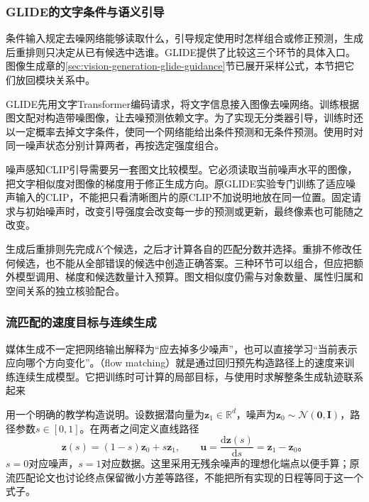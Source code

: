 \subsubsection{GLIDE的文字条件与语义引导}
\label{sec:vision-models-glide}

条件输入规定去噪网络能够读取什么，引导规定使用时怎样组合或修正预测，生成后重排则只决定从已有候选中选谁。GLIDE提供了比较这三个环节的具体入口。图像生成章的\ref{sec:vision-generation-glide-guidance}节已展开采样公式，本节把它们放回模块关系中。

GLIDE先用文字Transformer编码请求，将文字信息接入图像去噪网络。训练根据图文配对构造带噪图像，让去噪预测依赖文字。为了实现无分类器引导，训练时还以一定概率去掉文字条件，使同一个网络能给出条件预测和无条件预测。使用时对同一噪声状态分别计算两者，再按选定强度组合。

噪声感知CLIP引导需要另一套图文比较模型。它必须读取当前噪声水平的图像，把文字相似度对图像的梯度用于修正生成方向。原GLIDE实验专门训练了适应噪声输入的CLIP，不能把只看清晰图片的原CLIP不加说明地放在同一位置。固定请求与初始噪声时，改变引导强度会改变每一步的预测或更新，最终像素也可能随之改变。

生成后重排则先完成$K$个候选，之后才计算各自的匹配分数并选择。重排不修改任何候选，也不能从全部错误的候选中创造正确答案。三种环节可以组合，但应把额外模型调用、梯度和候选数量计入预算。图文相似度仍需与对象数量、属性归属和空间关系的独立核验配合。

\subsubsection{流匹配的速度目标与连续生成}
\label{sec:vision-models-flow-matching}

媒体生成不一定把网络输出解释为“应去掉多少噪声”，也可以直接学习“当前表示应向哪个方向变化”。（flow matching）就是通过回归预先构造路径上的速度来训练连续生成模型。它把训练时可计算的局部目标，与使用时求解整条生成轨迹联系起来

用一个明确的教学构造说明。设数据潜向量为$\bm z_1\in\mathbb R^d$，噪声为$\bm z_0\sim\mathcal N(\bm0,\bm I)$，路径参数$s\in[0,1]$。在两者之间定义直线路径
\begin{equation}
  \bm z(s)=(1-s)\bm z_0+s\bm z_1,
  \qquad
  \bm u=\frac{\mathrm d\bm z(s)}{\mathrm ds}
       =\bm z_1-\bm z_0\text{。}
  \label{eq:vision-flow-path}
\end{equation}
$s=0$对应噪声，$s=1$对应数据。这里采用无残余噪声的理想化端点以便手算；原流匹配论文也讨论终点保留微小方差等路径，不能把所有实现的日程等同于这一个式子。


